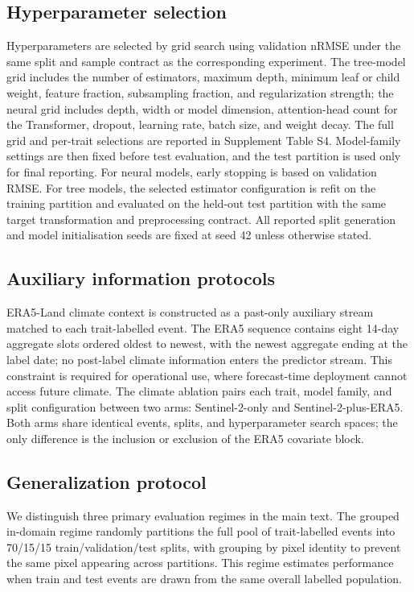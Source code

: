 \documentclass[final,times,onecolumn, authoryear]{elsarticle}
\begin{document}
\begin{linenumbers}
\subsection{Hyperparameter selection}

Hyperparameters are selected by grid search using validation nRMSE under the same split and sample contract as the corresponding experiment. The tree-model grid includes the number of estimators, maximum depth, minimum leaf or child weight, feature fraction, subsampling fraction, and regularization strength; the neural grid includes depth, width or model dimension, attention-head count for the Transformer, dropout, learning rate, batch size, and weight decay. The full grid and per-trait selections are reported in Supplement Table S4. Model-family settings are then fixed before test evaluation, and the test partition is used only for final reporting. For neural models, early stopping is based on validation RMSE. For tree models, the selected estimator configuration is refit on the training partition and evaluated on the held-out test partition with the same target transformation and preprocessing contract. All reported split generation and model initialisation seeds are fixed at seed 42 unless otherwise stated.

\subsection{Auxiliary information protocols}

ERA5-Land climate context is constructed as a past-only auxiliary stream matched to each trait-labelled event. The ERA5 sequence contains eight 14-day aggregate slots ordered oldest to newest, with the newest aggregate ending at the label date; no post-label climate information enters the predictor stream. This constraint is required for operational use, where forecast-time deployment cannot access future climate. The climate ablation pairs each trait, model family, and split configuration between two arms: Sentinel-2-only and Sentinel-2-plus-ERA5. Both arms share identical events, splits, and hyperparameter search spaces; the only difference is the inclusion or exclusion of the ERA5 covariate block.

\subsection{Generalization protocol}

We distinguish three primary evaluation regimes in the main text. The grouped in-domain regime randomly partitions the full pool of trait-labelled events into 70/15/15 train/validation/test splits, with grouping by pixel identity to prevent the same pixel appearing across partitions. This regime estimates performance when train and test events are drawn from the same overall labelled population.


\end{linenumbers}
\end{document}
